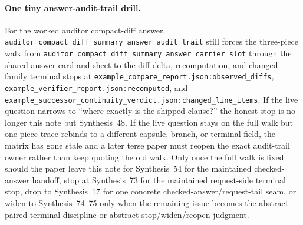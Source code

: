 \documentclass[11pt]{article}
\begin{document}
\paragraph{One tiny answer-audit-trail drill.}
For the worked auditor compact-diff answer, \nolinkurl{auditor_compact_diff_summary_answer_audit_trail} still forces the three-piece walk from \nolinkurl{auditor_compact_diff_summary_answer_carrier_slot} through the shared answer card and sheet to the diff-delta, recomputation, and changed-family terminal stops at \nolinkurl{example_compare_report.json:observed_diffs}, \nolinkurl{example_verifier_report.json:recomputed}, and \nolinkurl{example_successor_continuity_verdict.json:changed_line_items}. If the live question narrows to ``where exactly is the shipped clause?'' the honest stop is no longer this note but Synthesis~48. If the live question stays on the full walk but one piece trace rebinds to a different capsule, branch, or terminal field, the matrix has gone stale and a later terse paper must reopen the exact audit-trail owner rather than keep quoting the old walk. Only once the full walk is fixed should the paper leave this note for Synthesis~54 for the maintained checked-answer handoff, stop at Synthesis~73 for the maintained request-side terminal stop, drop to Synthesis~17 for one concrete checked-answer/request-tail seam, or widen to Synthesis~74--75 only when the remaining issue becomes the abstract paired terminal discipline or abstract stop/widen/reopen judgment.\cite{series:workedexample}
\end{document}
